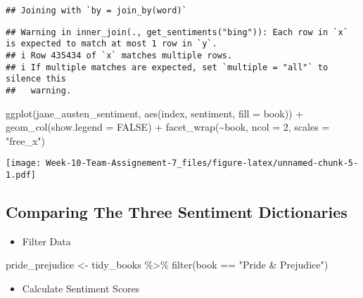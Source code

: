 \documentclass[
]{article}
\newenvironment{Shaded}{\begin{snugshade}}{\end{snugshade}}
\newcommand{\AttributeTok}[1]{\textcolor[rgb]{0.77,0.63,0.00}{#1}}
\newcommand{\ConstantTok}[1]{\textcolor[rgb]{0.00,0.00,0.00}{#1}}
\newcommand{\DecValTok}[1]{\textcolor[rgb]{0.00,0.00,0.81}{#1}}
\newcommand{\FunctionTok}[1]{\textcolor[rgb]{0.00,0.00,0.00}{#1}}
\newcommand{\NormalTok}[1]{#1}
\newcommand{\OtherTok}[1]{\textcolor[rgb]{0.56,0.35,0.01}{#1}}
\newcommand{\SpecialCharTok}[1]{\textcolor[rgb]{0.00,0.00,0.00}{#1}}
\newcommand{\StringTok}[1]{\textcolor[rgb]{0.31,0.60,0.02}{#1}}
\providecommand{\tightlist}{%
  \setlength{\itemsep}{0pt}\setlength{\parskip}{0pt}}
\begin{document}
\begin{verbatim}
## Joining with `by = join_by(word)`
\end{verbatim}

\begin{verbatim}
## Warning in inner_join(., get_sentiments("bing")): Each row in `x` is expected to match at most 1 row in `y`.
## i Row 435434 of `x` matches multiple rows.
## i If multiple matches are expected, set `multiple = "all"` to silence this
##   warning.
\end{verbatim}

\begin{Shaded}
\begin{Highlighting}[]
\FunctionTok{ggplot}\NormalTok{(jane\_austen\_sentiment, }\FunctionTok{aes}\NormalTok{(index, sentiment, }\AttributeTok{fill =}\NormalTok{ book)) }\SpecialCharTok{+}
  \FunctionTok{geom\_col}\NormalTok{(}\AttributeTok{show.legend =} \ConstantTok{FALSE}\NormalTok{) }\SpecialCharTok{+}
  \FunctionTok{facet\_wrap}\NormalTok{(}\SpecialCharTok{\textasciitilde{}}\NormalTok{book, }\AttributeTok{ncol =} \DecValTok{2}\NormalTok{, }\AttributeTok{scales =} \StringTok{"free\_x"}\NormalTok{)}
\end{Highlighting}
\end{Shaded}

\texttt{[image: Week-10-Team-Assignement-7\_files/figure-latex/unnamed-chunk-5-1.pdf]}

\hypertarget{comparing-the-three-sentiment-dictionaries}{%
\subsection{Comparing The Three Sentiment
Dictionaries}\label{comparing-the-three-sentiment-dictionaries}}

\begin{itemize}
\tightlist
\item
  Filter Data
\end{itemize}

\begin{Shaded}
\begin{Highlighting}[]
\NormalTok{pride\_prejudice }\OtherTok{\textless{}{-}}\NormalTok{ tidy\_books }\SpecialCharTok{\%\textgreater{}\%} 
  \FunctionTok{filter}\NormalTok{(book }\SpecialCharTok{==} \StringTok{"Pride \& Prejudice"}\NormalTok{)}
\end{Highlighting}
\end{Shaded}

\begin{itemize}
\tightlist
\item
  Calculate Sentiment Scores
\end{itemize}
\end{document}
